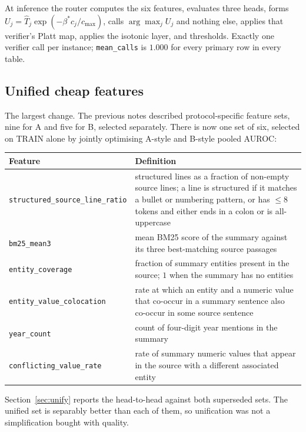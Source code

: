 \documentclass[10pt,a4paper]{article}
\newcommand{\fix}[1]{\textcolor{red!65!black}{#1}}
\begin{document}
At inference the router computes the six features, evaluates three heads, forms
$U_j=\hat T_j\exp(-\beta^{*}c_j/c_{\max})$, calls $\arg\max_j U_j$ and nothing else, applies that
verifier's Platt map, applies the isotonic layer, and thresholds. Exactly one verifier call per
instance; \texttt{mean\_calls} is $1.000$ for every primary row in every table.

\subsection{Unified cheap features}

\fix{The largest change.} The previous notes described protocol-specific feature sets, nine for A
and five for B, selected separately. There is now one set of six, selected on TRAIN alone by
jointly optimising A-style and B-style pooled AUROC:

\begin{center}\small
\begin{tabular}{p{4.6cm}p{10.4cm}}
\toprule
Feature & Definition \\
\midrule
\texttt{structured\_source\_line\_ratio} & structured lines as a fraction of non-empty source
  lines; a line is structured if it matches a bullet or numbering pattern, or has $\le8$ tokens
  and either ends in a colon or is all-uppercase \\
\texttt{bm25\_mean3} & mean BM25 score of the summary against its three best-matching source
  passages \\
\texttt{entity\_coverage} & fraction of summary entities present in the source; $1$ when the
  summary has no entities \\
\texttt{entity\_value\_colocation} & rate at which an entity and a numeric value that co-occur in
  a summary sentence also co-occur in some source sentence \\
\texttt{year\_count} & count of four-digit year mentions in the summary \\
\texttt{conflicting\_value\_rate} & rate of summary numeric values that appear in the source with
  a different associated entity \\
\bottomrule
\end{tabular}
\end{center}

Section~\ref{sec:unify} reports the head-to-head against both superseded sets. The unified set is
separably better than each of them, so unification was not a simplification bought with quality.
\end{document}
